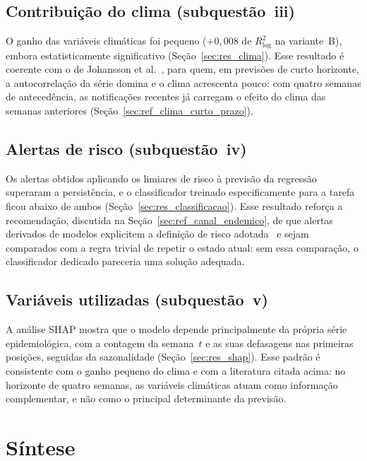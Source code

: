 \subsection{Contribuição do clima (subquestão~iii)}

O ganho das variáveis climáticas foi pequeno ($+0{,}008$ de $R^2_{\log}$ na variante~B), embora estatisticamente significativo (Seção~\ref{sec:res_clima}). Esse resultado é coerente com o de Johansson et al.~\cite{johansson2016evaluating}, para quem, em previsões de curto horizonte, a autocorrelação da série domina e o clima acrescenta pouco: com quatro semanas de antecedência, as notificações recentes já carregam o efeito do clima das semanas anteriores (Seção~\ref{sec:ref_clima_curto_prazo}).

\subsection{Alertas de risco (subquestão~iv)}

Os alertas obtidos aplicando os limiares de risco à previsão da regressão superaram a persistência, e o classificador treinado especificamente para a tarefa ficou abaixo de ambos (Seção~\ref{sec:res_classificacao}). Esse resultado reforça a recomendação, discutida na Seção~\ref{sec:ref_canal_endemico}, de que alertas derivados de modelos explicitem a definição de risco adotada~\cite{brady2015outbreak} e sejam comparados com a regra trivial de repetir o estado atual: sem essa comparação, o classificador dedicado pareceria uma solução adequada.

\subsection{Variáveis utilizadas (subquestão~v)}

A análise SHAP mostra que o modelo depende principalmente da própria série epidemiológica, com a contagem da semana~$t$ e as suas defasagens nas primeiras posições, seguidas da sazonalidade (Seção~\ref{sec:res_shap}). Esse padrão é consistente com o ganho pequeno do clima e com a literatura citada acima: no horizonte de quatro semanas, as variáveis climáticas atuam como informação complementar, e não como o principal determinante da previsão.

\section{Síntese}
\label{sec:res_sintese}

